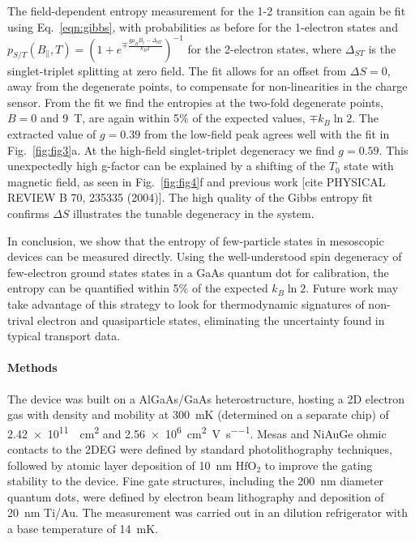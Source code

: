 \documentclass[twocolumn,showpacs,preprintnumbers,amsmath,amssymb,pra,aps,superscriptaddress]{revtex4-1}
\begin{document}
The field-dependent entropy measurement for the 1-2 transition can again be fit using Eq.~\ref{eqn:gibbs}, with probabilities as before for the 1-electron states and $p_{S/T}(B_\parallel, T) = (1+ e^{\mp \frac{g\mu_B B_\parallel - \Delta_{ST}}{k_B T}})^{-1}$ for the 2-electron states, where $\Delta_{ST}$ is the singlet-triplet splitting at zero field. The fit allows for an offset from $\Delta S=0$, away from the degenerate points, to compensate for non-linearities in the charge sensor. From the fit we find the entropies at the two-fold degenerate points, $B=0$ and \SI{9}{\tesla}, are again within 5\% of the expected values, $\mp k_B \ln{2}$. The extracted value of $g = 0.39$ from the low-field peak agrees well with the fit in Fig.~\ref{fig:fig3}a. At the high-field singlet-triplet degeneracy we find $g = 0.59$. This unexpectedly high g-factor can be explained by a shifting of the $T_{0}$ state with magnetic field, as seen in Fig.~\ref{fig:fig4}f and previous work [cite PHYSICAL REVIEW B 70, 235335 (2004)]. The high quality of the Gibbs entropy fit confirms $\Delta S$ illustrates the tunable degeneracy in the system.

In conclusion, we show that the entropy of few-particle states in mesoscopic devices can be measured directly.  Using the well-understood spin degeneracy of  few-electron ground states states in a GaAs quantum dot for calibration, the entropy can be quantified within 5\% of the expected $k_B\ln{2}$.  Future work may take advantage of this strategy to look for thermodynamic signatures of non-trival electron and quasiparticle states, eliminating the uncertainty found in typical transport data.

\paragraph*{Methods} The device was built on a AlGaAs/GaAs heterostructure, hosting a 2D electron gas with density and mobility at \SI{300}{\milli\kelvin} (determined on a separate chip) of \SI{2.42e11}{\per\square\centi\metre} and \SI[per-mode=symbol]{2.56e6}{\square\centi\metre\per\volt\per\second}.   Mesas and NiAuGe ohmic contacts to the 2DEG were defined by standard photolithography techniques, followed by atomic layer deposition of \SI{10}{\nano\metre} $\mathrm{HfO_2}$ to improve the gating stability to the device. Fine gate structures, including the \SI{200}{\nano\metre} diameter quantum dots, were defined by electron beam lithography and deposition of \SI{20}{\nano\metre} Ti/Au. The measurement was carried out in an dilution refrigerator with a base temperature of \SI{14}{\milli\kelvin}.
\end{document}
